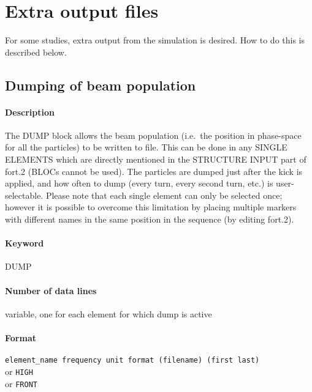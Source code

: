\documentclass[a4paper,11pt]{report}
\begin{document}
\section{Extra output files}
For some studies, extra output from the simulation is desired.
How to do this is described below.

\subsection{Dumping of beam population} \label{sec:DUMP}

\paragraph{Description}
The DUMP block allows the beam population (i.e.\ the position in phase-space for all the particles) to be written to file.
This can be done in any SINGLE ELEMENTS which are directly mentioned in the STRUCTURE INPUT part of fort.2 (BLOCs cannot be used).
The particles are dumped just after the kick is applied, and how often to dump (every turn, every second turn, etc.) is user-selectable.
Please note that each single element can only be selected once; however it is possible to overcome this limitation by placing multiple markers with different names in the same position in the sequence (by editing fort.2).

\paragraph{Keyword}
DUMP

\paragraph{Number of data lines}
variable, one for each element for which dump is active

\paragraph{Format}
\texttt{element\_name frequency unit format (filename) (first last)}\\
or \texttt{HIGH}\\
or \texttt{FRONT}
\end{document}
